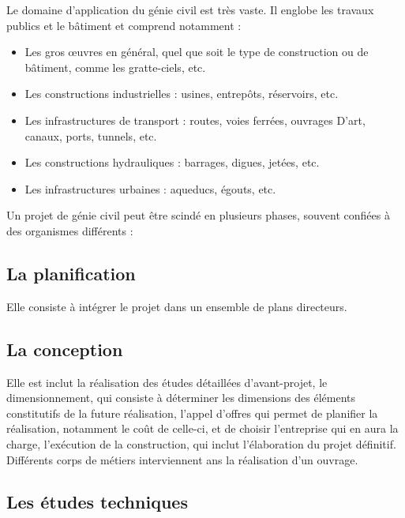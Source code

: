 \documentclass[12pt,a4paper]{report}
\numberwithin{equation}{section}
\begin{document}
	\vspace{\baselineskip}
	
	Le domaine d'application du génie civil est très vaste. Il englobe les travaux publics et le
	bâtiment et comprend notamment :
	
	\begin{itemize}
		\item Les gros œuvres en général, quel que soit le type de construction ou de bâtiment, comme les gratte-ciels, etc.
		
		\item Les constructions industrielles : usines, entrepôts, réservoirs, etc.
		
		\item Les infrastructures de transport : routes, voies ferrées, ouvrages D'art, canaux, ports,
		tunnels, etc.
		
		\item Les constructions hydrauliques : barrages, digues, jetées, etc.
		
		\item Les infrastructures urbaines : aqueducs, égouts, etc.
	\end{itemize}
	
	Un projet de génie civil peut être scindé en plusieurs phases, souvent confiées à des
	organismes différents :
	
	
	\subsection*{La planification}
	
	Elle consiste à intégrer le projet dans un ensemble de plans directeurs.
	
	\subsection*{La conception}
	
	Elle est inclut la réalisation des études détaillées d'avant-projet, le dimensionnement, qui consiste à déterminer les dimensions des éléments constitutifs de la future réalisation, l'appel d'offres qui permet de planifier la réalisation, notamment le coût de celle-ci, et de choisir
	l'entreprise qui en aura la charge, l'exécution de la construction, qui inclut l'élaboration du projet définitif. Différents corps de métiers interviennent ans la réalisation d'un ouvrage.
	
	\subsection*{Les études techniques}
	
\end{document}

